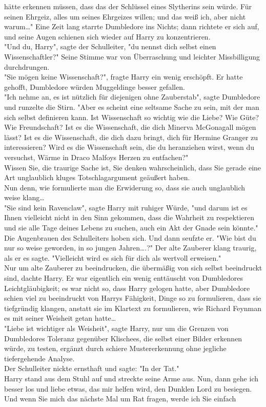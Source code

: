 {hätte erkennen müssen, dass das der Schlüssel eines Slytherins sein würde. Für seinen Ehrgeiz, alles um seines Ehrgeizes willen; und das weiß ich, aber nicht warum…" Eine Zeit lang starrte Dumbledore ins Nichts; dann richtete er sich auf, und seine Augen schienen sich wieder auf Harry zu konzentrieren.\\ "Und du, Harry", sagte der Schulleiter, "du nennst dich selbst einen Wissenschaftler?" Seine Stimme war von Überraschung und leichter Missbilligung durchdrungen.\\ "Sie mögen keine Wissenschaft?", fragte Harry ein wenig erschöpft. Er hatte gehofft, Dumbledore würden Muggeldinge besser gefallen.\\ "Ich nehme an, es ist nützlich für diejenigen ohne Zauberstab", sagte Dumbledore und runzelte die Stirn. "Aber es scheint eine seltsame Sache zu sein, mit der man sich selbst definieren kann. Ist Wissenschaft so wichtig wie die Liebe? Wie Güte? Wie Freundschaft? Ist es die Wissenschaft, die dich Minerva McGonagall mögen lässt? Ist es die Wissenschaft, die dich dazu bringt, dich für Hermine Granger zu interessieren? Wird es die Wissenschaft sein, die du heranziehen wirst, wenn du versuchst, Wärme in Draco Malfoys Herzen zu entfachen?"\\ Wissen Sie, die traurige Sache ist, Sie denken wahrscheinlich, dass Sie gerade eine Art unglaublich kluges Totschlagargument geäußert haben.\\ Nun denn, wie formulierte man die Erwiderung so, dass sie auch unglaublich weise klang…\\ "Sie sind kein Ravenclaw", sagte Harry mit ruhiger Würde, "und darum ist es Ihnen vielleicht nicht in den Sinn gekommen, dass die Wahrheit zu respektieren und sie alle Tage deines Lebens zu suchen, auch ein Akt der Gnade sein könnte."\\ Die Augenbrauen des Schulleiters hoben sich. Und dann seufzte er. "Wie bist du nur so weise geworden, in so jungen Jahren….?" Der alte Zauberer klang traurig, als er es sagte. "Vielleicht wird es sich für dich als wertvoll erweisen."\\ Nur um alte Zauberer zu beeindrucken, die übermäßig von sich selbst beeindruckt sind, dachte Harry. Er war eigentlich ein wenig enttäuscht von Dumbledores Leichtgläubigkeit; es war nicht so, dass Harry gelogen hatte, aber Dumbledore schien viel zu beeindruckt von Harrys Fähigkeit, Dinge so zu formulieren, dass sie tiefgründig klangen, anstatt sie im Klartext zu formulieren, wie Richard Feynman es mit seiner Weisheit getan hatte…\\ "Liebe ist wichtiger als Weisheit", sagte Harry, nur um die Grenzen von Dumbledores Toleranz gegenüber Klischees, die selbst einer Bilder erkennen würde, zu testen, ergänzt durch schiere Mustererkennung ohne jegliche tiefergehende Analyse.\\ Der Schulleiter nickte ernsthaft und sagte: "In der Tat."\\ Harry stand aus dem Stuhl auf und streckte seine Arme aus. Nun, dann gehe ich besser los und liebe etwas, das mir helfen wird, den Dunklen Lord zu besiegen. Und wenn Sie mich das nächste Mal um Rat fragen, werde ich Sie einfach }
